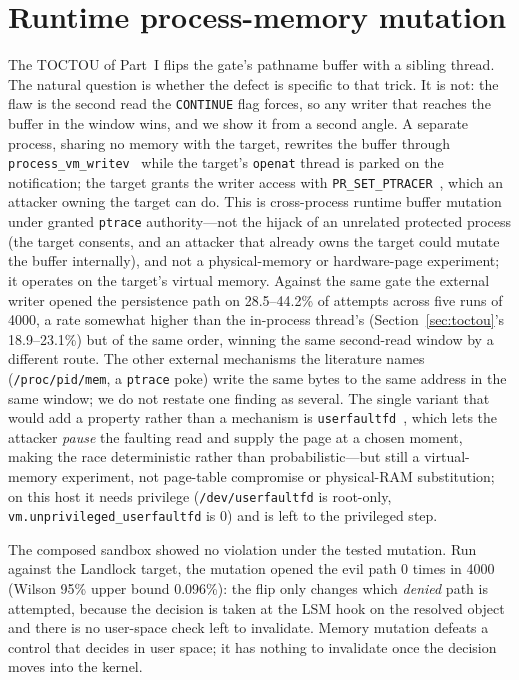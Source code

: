 \documentclass[11pt]{article}
\newcommand{\Nrace}{4000}
\newcommand{\RaceLo}{18.9}
\newcommand{\RaceHi}{23.1}
\begin{document}
\section{Runtime process-memory mutation}\label{sec:memmut}

The TOCTOU of Part~I flips the gate's pathname buffer with a sibling thread. The natural question is
whether the defect is specific to that trick. It is not: the flaw is the second read the \texttt{CONTINUE}
flag forces, so any writer that reaches the buffer in the window wins, and we show it from a second angle.
A separate process, sharing no memory with the target, rewrites the buffer through
\texttt{process\_vm\_writev}~\cite{procvmwritev} while the target's \texttt{openat} thread is parked on the
notification; the target grants the writer access with \texttt{PR\_SET\_PTRACER}~\cite{prctl}, which an
attacker owning the target can do. This is cross-process runtime buffer mutation under granted
\texttt{ptrace} authority---not the hijack of an unrelated protected process (the target consents, and an
attacker that already owns the target could mutate the buffer internally), and not a physical-memory or
hardware-page experiment; it operates on the target's virtual memory. Against the same gate the external
writer opened the persistence path on 28.5--44.2\% of attempts across five runs of \Nrace{}, a rate
somewhat higher than the in-process thread's (Section~\ref{sec:toctou}'s \RaceLo--\RaceHi\%) but of the
same order, winning the same second-read window by a different route. The other external
mechanisms the literature names
(\texttt{/proc/pid/mem}, a \texttt{ptrace} poke) write the same bytes to the same address in the same
window; we do not restate one finding as several. The single variant that would add a property rather than
a mechanism is \texttt{userfaultfd}~\cite{userfaultfd}, which lets the attacker \emph{pause} the faulting
read and supply the page at a chosen moment, making the race deterministic rather than probabilistic---but
still a virtual-memory experiment, not page-table compromise or physical-RAM substitution; on this host it
needs privilege (\texttt{/dev/userfaultfd} is root-only, \texttt{vm.unprivileged\_userfaultfd} is 0) and is
left to the privileged step.

The composed sandbox showed no violation under the tested mutation. Run against the Landlock target,
the mutation opened the evil path 0 times in \Nrace{} (Wilson 95\% upper bound 0.096\%): the flip only
changes which \emph{denied} path is attempted, because the decision is taken at the LSM hook on the
resolved object and there is no user-space check left to invalidate. Memory mutation defeats a control that decides in user space; it has nothing to
invalidate once the decision moves into the kernel.
\end{document}
